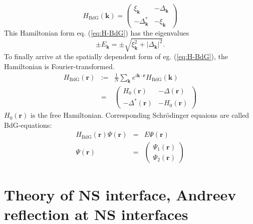 \begin{equation}
H_\text{BdG}\left(\mathbf{k} \right) = \begin{pmatrix}
\xi_\mathbf{k} &  - \Delta_\mathbf{k}\\
- \Delta^*_\mathbf{k} & - \xi_\mathbf{k}
\end{pmatrix} \label{eq:H-BdG}
\end{equation}
This Hamiltonian form eq. (\ref{eq:H-BdG}) has the eigenvalues
\begin{equation}
 \pm E_\mathbf{k} = \pm \sqrt{\xi_\mathbf{k}^2 + |\Delta_\mathbf{k}|^2  }.
\end{equation}
To finally arrive at the spatially dependent form of eg. (\ref{eq:H-BdG}), the Hamiltonian is Fourier-transformed.
\begin{eqnarray}
H_\text{BdG} \left( \mathbf{r} \right) &:=& \frac{1}{N} \sum_\mathbf{k} e^{i \mathbf{k \cdot r}} H_\text{BdG}\left( \mathbf{k} \right) \\
&=& \begin{pmatrix}
H_0\left( \mathbf{r} \right)  &  - \Delta \left( \mathbf{r} \right) \\
- \Delta^* \left( \mathbf{r} \right)  & - H_0 \left( \mathbf{r} \right) 
\end{pmatrix} \label{eq:H-BdG-r}
\end{eqnarray}
$H_0 \left( \mathbf{r} \right) $ is the free Hamiltonian. Corresponding Schr\"odinger equaions are called BdG-equations:
\begin{eqnarray}
H_\text{BdG} \left( \mathbf{r} \right) \Psi\left( \mathbf{r} \right) &=& E \Psi\left( \mathbf{r} \right)\label{eq:BdG-eq} \\
\Psi\left( \mathbf{r} \right)  &=& \begin{pmatrix}
\Psi_1\left( \mathbf{r} \right) \\ \Psi_2\left( \mathbf{r} \right) 
\end{pmatrix}\label{eq:BdG-spinor}
\end{eqnarray}

\section{Theory of NS interface, Andreev reflection at NS interfaces}


